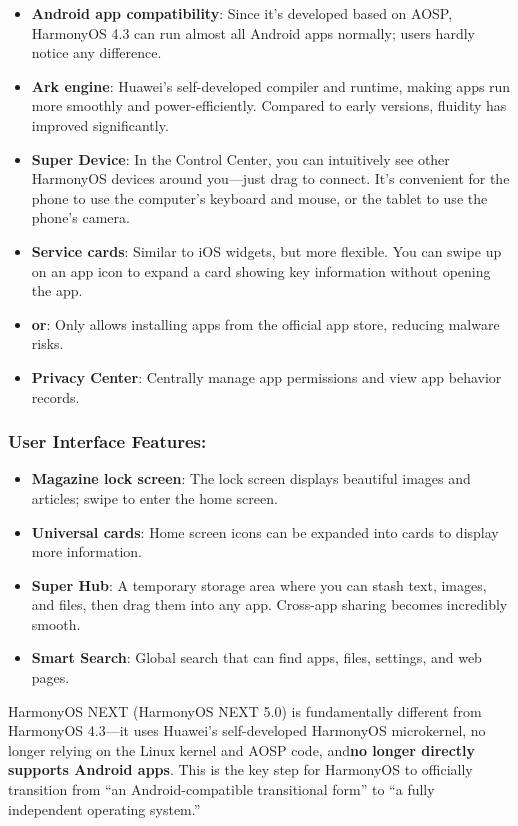 \begin{itemize}
  \item \textbf{Android app compatibility}: Since it's developed based on AOSP, HarmonyOS 4.3 can run almost all Android apps normally; users hardly notice any difference.
  \item \textbf{Ark engine}: Huawei's self-developed compiler and runtime, making apps run more smoothly and power-efficiently. Compared to early versions, fluidity has improved significantly.
  \item \textbf{Super Device}: In the Control Center, you can intuitively see other HarmonyOS devices around you—just drag to connect. It's convenient for the phone to use the computer's keyboard and mouse, or the tablet to use the phone's camera.
  \item \textbf{Service cards}: Similar to iOS widgets, but more flexible. You can swipe up on an app icon to expand a card showing key information without opening the app.
  \item \textbf{or}: Only allows installing apps from the official app store, reducing malware risks.
  \item \textbf{Privacy Center}: Centrally manage app permissions and view app behavior records.
\end{itemize}

\subsubsection*{User Interface Features:}

\begin{itemize}
  \item \textbf{Magazine lock screen}: The lock screen displays beautiful images and articles; swipe to enter the home screen.
  \item \textbf{Universal cards}: Home screen icons can be expanded into cards to display more information.
  \item \textbf{Super Hub}: A temporary storage area where you can stash text, images, and files, then drag them into any app. Cross-app sharing becomes incredibly smooth.
  \item \textbf{Smart Search}: Global search that can find apps, files, settings, and web pages.
\end{itemize}


HarmonyOS NEXT (HarmonyOS NEXT 5.0) is fundamentally different from HarmonyOS 4.3—it uses Huawei's self-developed HarmonyOS microkernel, no longer relying on the Linux kernel and AOSP code, and\textbf{no longer directly supports Android apps}. This is the key step for HarmonyOS to officially transition from “an Android-compatible transitional form” to “a fully independent operating system.”

